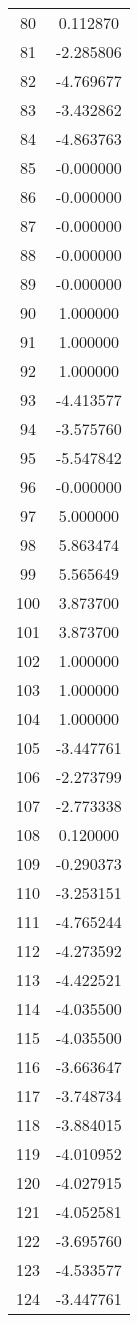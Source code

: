\documentclass[12pt]{article}
\begin{document}
\begin{longtable}{@{}cc@{}}
80 & 0.112870 \\
81 & -2.285806 \\
82 & -4.769677 \\
83 & -3.432862 \\
84 & -4.863763 \\
85 & -0.000000 \\
86 & -0.000000 \\
87 & -0.000000 \\
88 & -0.000000 \\
89 & -0.000000 \\
90 & 1.000000 \\
91 & 1.000000 \\
92 & 1.000000 \\
93 & -4.413577 \\
94 & -3.575760 \\
95 & -5.547842 \\
96 & -0.000000 \\
97 & 5.000000 \\
98 & 5.863474 \\
99 & 5.565649 \\
100 & 3.873700 \\
101 & 3.873700 \\
102 & 1.000000 \\
103 & 1.000000 \\
104 & 1.000000 \\
105 & -3.447761 \\
106 & -2.273799 \\
107 & -2.773338 \\
108 & 0.120000 \\
109 & -0.290373 \\
110 & -3.253151 \\
111 & -4.765244 \\
112 & -4.273592 \\
113 & -4.422521 \\
114 & -4.035500 \\
115 & -4.035500 \\
116 & -3.663647 \\
117 & -3.748734 \\
118 & -3.884015 \\
119 & -4.010952 \\
120 & -4.027915 \\
121 & -4.052581 \\
122 & -3.695760 \\
123 & -4.533577 \\
124 & -3.447761 \\

\end{longtable}
\end{document}
